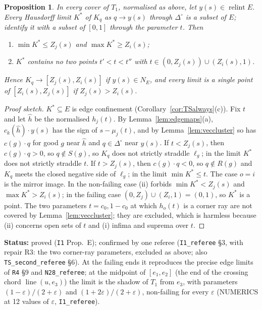 \documentclass[11pt]{article}
\newtheorem{proposition}[theorem]{Proposition}
\theoremstyle{definition}
\theoremstyle{remark}
\newcommand{\Di}{\Delta^{\circ}}
\newcommand{\relint}{\operatorname{relint}}
\newcommand{\lin}{\operatorname{line}}
\newcommand{\src}[1]{\texttt{#1}}
\newcommand{\status}[1]{\par\smallskip\noindent\textbf{Status:} #1\par\smallskip}
\begin{document}
\begin{proposition}\label{prop:edgelimits}
In every cover of $T_1$, normalised as above, let $y(s)\in\relint E$. Every Hausdorff limit $K^*$ of $K_q$ as $q\to y(s)$ through $\Di$ is a subset of $E$; identify it with a subset of $[0,1]$ through the parameter $t$. Then
\begin{enumerate}[leftmargin=*,label=(\roman*)]
\item $\min K^*\le Z_j(s)$ and $\max K^*\ge Z_i(s)$;
\item $K^*$ contains no two points $t'<t<t''$ with $t\in(0,Z_j(s))\cup(Z_i(s),1)$.
\end{enumerate}
Hence $K_q\to[Z_j(s),Z_i(s)]$ if $y(s)\in N_E$, and every limit is a single point of $[Z_i(s),Z_j(s)]$ if $Z_j(s)>Z_i(s)$.
\end{proposition}
\begin{proof}[Proof sketch]
$K^*\subseteq E$ is edge confinement (Corollary~\ref{cor:TSalways}(c)). Fix $t$ and let $\hat h$ be the normalised $h_j(t)$. By Lemma~\ref{lem:edgemaps}(a), $c_k(\hat h)\cdot y(s)$ has the sign of $s-\mu_j(t)$, and by Lemma~\ref{lem:veccluster} so has $c(g)\cdot q$ for good $g$ near $\hat h$ and $q\in\Di$ near $y(s)$. If $t<Z_j(s)$, then $c(g)\cdot q>0$, so $q\notin S(g)$, so $K_q$ does not strictly straddle $\ell_g$; in the limit $K^*$ does not strictly straddle $t$. If $t>Z_j(s)$, then $c(g)\cdot q<0$, so $q\notin R(g)$ and $K_q$ meets the closed negative side of $\ell_g$; in the limit $\min K^*\le t$. The case $o=i$ is the mirror image. In the non-failing case (ii) forbids $\min K^*<Z_j(s)$ and $\max K^*>Z_i(s)$; in the failing case $(0,Z_j)\cup(Z_i,1)=(0,1)$, so $K^*$ is a point. The two parameters $t=c_0,1-c_0$ at which $h_o(t)$ is a corner ray are not covered by Lemma~\ref{lem:veccluster}; they are excluded, which is harmless because (ii) concerns open sets of $t$ and (i) infima and suprema over $t$.
\end{proof}
\status{proved (\src{I1} Prop.~E); confirmed by one referee (\src{I1\_referee} \S3, with repair R3: the two corner-ray parameters, excluded as above; also \src{TS\_second\_referee} \S6). At the failing ends it reproduces the precise edge limits of \src{R4} \S9 and \src{N28\_referee}; at the midpoint of $[e_1,e_2]$ (the end of the crossing chord $\lin(u,e_3)$) the limit is the shadow of $T_1$ from $e_3$, with parameters $(1-\varepsilon)/(2+\varepsilon)$ and $(1+2\varepsilon)/(2+\varepsilon)$, non-failing for every $\varepsilon$ (NUMERICS at 12 values of $\varepsilon$, \src{I1\_referee}).}
\end{document}
